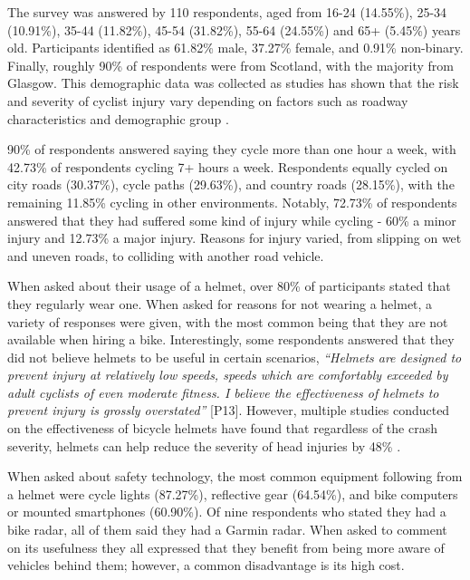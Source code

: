 \documentclass{interim}
\begin{document}
The survey was answered by 110 respondents, aged from 16-24 (14.55\%), 25-34 (10.91\%), 35-44 (11.82\%), 45-54 (31.82\%), 55-64 (24.55\%) and 65+ (5.45\%) years old. Participants identified as 61.82\% male, 37.27\% female, and 0.91\% non-binary. Finally, roughly 90\% of respondents were from Scotland, with the majority from Glasgow. This demographic data was collected as studies has shown that the risk and severity of cyclist injury vary depending on factors such as roadway characteristics and demographic group \cite{BEHNOOD201735}.

90\% of respondents answered saying they cycle more than one hour a week, with 42.73\% of respondents cycling 7+ hours a week. Respondents equally cycled on city roads (30.37\%), cycle paths (29.63\%), and country roads (28.15\%), with the remaining 11.85\% cycling in other environments. Notably, 72.73\% of respondents answered that they had suffered some kind of injury while cycling - 60\% a minor injury and 12.73\% a major injury. Reasons for injury varied, from slipping on wet and uneven roads, to colliding with another road vehicle.

When asked about their usage of a helmet, over 80\% of participants stated that they regularly wear one. When asked for reasons for not wearing a helmet, a variety of responses were given, with the most common being that they are not available when hiring a bike. Interestingly, some respondents answered that they did not believe helmets to be useful in certain scenarios, \textit{“Helmets are designed to prevent injury at relatively low speeds, speeds which are comfortably exceeded by adult cyclists of even moderate fitness. I believe the effectiveness of helmets to prevent injury is grossly overstated”} [P13]. However, multiple studies conducted on the effectiveness of bicycle helmets \cite{10.1093/ije/dyw153, HOYE201885, HOYE2018239, buth2023effectiveness} have found that regardless of the crash severity, helmets can help reduce the severity of head injuries by 48\% \cite{HOYE201885}.

When asked about safety technology, the most common equipment following from a helmet were cycle lights (87.27\%), reflective gear (64.54\%), and bike computers or mounted smartphones (60.90\%). Of nine respondents who stated they had a bike radar, all of them said they had a Garmin radar. When asked to comment on its usefulness they all expressed that they benefit from being more aware of vehicles behind them; however, a common disadvantage is its high cost.
\end{document}
